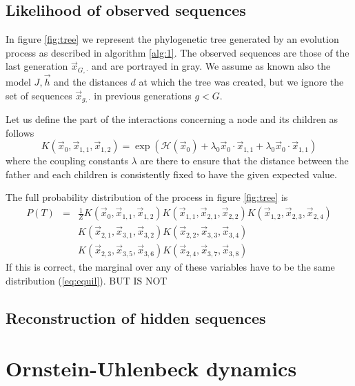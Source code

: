 \documentclass[10pt]{article}
\def\be{\begin{equation}}
\def\ee{\end{equation}}
\def\vx{\vec x}
\def\vh{\vec h}
\newcommand{\Ham}{\mathcal{H}}
\begin{document}
\subsection{Likelihood of observed sequences}

In figure \ref{fig:tree} we represent the phylogenetic tree generated by an evolution process as described in algorithm \ref{alg:1}. The observed sequences are those of the last generation $\vx_{G,\cdot}$ and are portrayed in gray. We assume as known also the model $J,\vh$ and the distances $d$ at which the tree was created, but we ignore the set of sequences $\vx_{g,\cdot}$ in previous generations $g<G$.

Let us define the part of the interactions concerning a node and its children as follows
\be
K(\vx_0,\vx_{1,1},\vx_{1,2}) = \exp\left( \Ham(\vx_0) + \lambda_0 \vx_0 \cdot \vx_{1,1} + \lambda_0 \vx_0 \cdot \vx_{1,1} \right)
\ee
where the coupling constants $\lambda$ are there to ensure that the distance between the father and each children is consistently fixed to have the given expected value. 

The full probability distribution of the process in figure \ref{fig:tree} is 
\begin{eqnarray}
 P(T) &=& \frac 1 Z K(\vx_0,\vx_{1,1},\vx_{1,2}) K(\vx_{1,1},\vx_{2,1},\vx_{2,2}) K(\vx_{1,2},\vx_{2,3},\vx_{2,4}) \nonumber \\
      &&  K(\vx_{2,1},\vx_{3,1},\vx_{3,2}) K(\vx_{2,2},\vx_{3,3},\vx_{3,4})  \label{eq:PT} \\
      &&  K(\vx_{2,3},\vx_{3,5},\vx_{3,6}) K(\vx_{2,4},\vx_{3,7},\vx_{3,8}) \nonumber 
\end{eqnarray}
If this is correct, the marginal over any of these variables have to be the same distribution (\ref{eq:equil}). BUT IS NOT


\subsection{Reconstruction of hidden sequences}


\section{Ornstein-Uhlenbeck dynamics} %
\label{sec:ornstein_uhlenbeck_dynamics}
\end{document}
